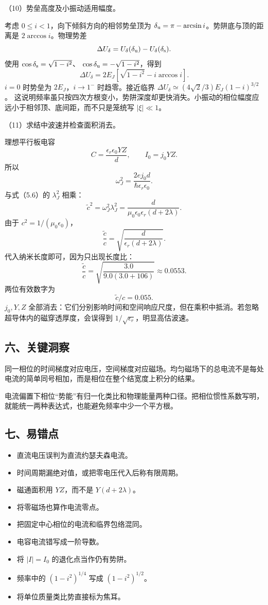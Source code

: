 \documentclass[12pt,a4paper,fontset=fandol]{ctexart}
\providecommand{\tightlist}{\setlength{\itemsep}{0pt}\setlength{\parskip}{0pt}}
\begin{document}
（10）势垒高度及小振动适用幅度。

考虑 \(0\le i<1\)，向下倾斜方向的相邻势垒顶为
\(\delta_{\rm u}=\pi-\arcsin i\)。势阱底与顶的距离是
\(2\arccos i\)。物理势差 \[
\Delta U_\delta
=U_\delta(\delta_{\rm u})-U_\delta(\delta_{\rm s}).
\] 使用 \(\cos\delta_{\rm s}=\sqrt{1-i^2}\)、
\(\cos\delta_{\rm u}=-\sqrt{1-i^2}\)，得到 \[
\boxed{\Delta U_\delta=
2E_J\left[\sqrt{1-i^2}-i\arccos i\right].}\tag{5.12}
\] \(i=0\) 时势垒为 \(2E_J\)，\(i\to1^-\) 时趋零。接近临界
\(\Delta U_\delta\simeq(4\sqrt2/3)E_J(1-i)^{3/2}\)。
这说明频率虽只按四次方根变小，势阱深度却更快消失。小振动的相位幅度应远小于相邻顶、底间距，而不只是笼统写
\(|\xi|\ll1\)。

（11）求结中波速并检查面积消去。

理想平行板电容 \[
C=\frac{\epsilon_r\epsilon_0YZ}{d},\qquad I_0=j_0YZ.
\] 所以 \[
\omega_J^2=\frac{2ej_0d}{\hbar\epsilon_r\epsilon_0}.
\] 与式（5.6）的 \(\lambda_J^2\) 相乘： \[
\tilde c^2=\omega_J^2\lambda_J^2
=\frac{d}{\mu_0\epsilon_0\epsilon_r(d+2\lambda)}.
\] 由于 \(c^2=1/(\mu_0\epsilon_0)\)， \[
\boxed{\frac{\tilde c}{c}
=\sqrt{\frac{d}{\epsilon_r(d+2\lambda)}}.}\tag{5.13}
\] 代入纳米长度即可，因为只出现长度比： \[
\frac{\tilde c}{c}
=\sqrt{\frac{3.0}{9.0(3.0+106)}}\approx0.0553.
\] 两位有效数字为 \[
\boxed{\tilde c/c=0.055.}
\] \(j_0,Y,Z\)
全部消去：它们分别影响时间和空间响应尺度，但在乘积中抵消。若忽略超导体内的磁穿透厚度，会误得到
\(1/\sqrt{\epsilon_r}\)，明显高估波速。

\subsection{六、关键洞察}\label{ux516dux5173ux952eux6d1eux5bdf-4}

同一相位的时间梯度对应电压，空间梯度对应磁场。均匀磁场下的总电流不是每处电流的简单同号相加，而是相位在整个结宽度上积分的结果。

电流偏置下相位``势能''有归一化类比和物理能量两种口径。把相位惯性系数写明，就能统一两种表达式，也能避免频率中少一个平方根。

\subsection{七、易错点}\label{ux4e03ux6613ux9519ux70b9-4}

\begin{itemize}
\tightlist
\item
  直流电压误判为直流约瑟夫森电流。
\item
  时间周期漏绝对值，或把零电压代入后称有限周期。
\item
  磁通面积用 \(YZ\)，而不是 \(Y(d+2\lambda)\)。
\item
  将零磁场也算作电流零点。
\item
  把固定中心相位的电流和临界包络混同。
\item
  电容电流错写成一阶导数。
\item
  将 \(|I|=I_0\) 的退化点当作仍有势阱。
\item
  频率中的 \((1-i^2)^{1/4}\) 写成 \((1-i^2)^{1/2}\)。
\item
  将单位质量类比势直接标为焦耳。
\end{itemize}
\end{document}
